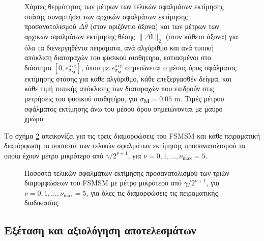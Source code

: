 \begin{figure}[!h]\vspace{2cm}\hspace{0.5cm}
  
  \vspace{1cm}
  \caption{\small Χάρτες θερμότητας των μέτρων των τελικών σφαλμάτων εκτίμησης
           στάσης συναρτήσει των αρχικών σφαλμάτων εκτίμησης προσανατολισμού
           $\Delta\hat{\theta}$ (στον οριζόντιο άξονα) και των μέτρων των
           αρχικων σφαλμάτων εκτίμησης θέσης $\|\Delta \hat{\bm{l}}\|_2$ (στον
           κάθετο άξονα) για όλα τα διενεργηθέντα πειράματα, ανά αλγόριθμο και
           ανά τυπική απόκλιση διαταραχών του φυσικού αισθητηρα, εστιασμένοι
           στο διάστημα $[0, e_{\sigma_{\bm{M}}}^{\text{avg}}]$, όπου με
           $e_{\sigma_{\bm{M}}}^{\text{avg}}$ σημειώνεται ο μέσος όρος
           σφάλματος εκτίμησης στάσης για κάθε αλγόριθμο, κάθε επεξεργασθέν
           δείγμα, και κάθε τιμή τυπικής απόκλισης των διαταραχών που επιδρούν
           στις μετρήσεις του φυσικού αισθητήρα, για $\sigma_{\bm{M}} = 0.05$
           m.  Τιμές μέτρου σφάλματος εκτίμησης άνω του μέσου όρου σημειώνονται
           με μαύρο χρώμα}
  \label{fig:02_04_05:09}
\end{figure}




Το σχήμα \ref{fig:02_04_05:13} απεικονίζει για τις τρεις διαμορφώσεις του FSMSM
και κάθε πειραματική διαμόρφωση τα ποσοστά των τελικών σφαλμάτων εκτίμησης
προσανατολισμού τα οποία έχουν μέτρο μικρότερο από $\gamma / 2^{\nu+1}$, για
$\nu = 0,1,\dots,\nu_{\max} = 5$.

\begin{figure}[!h]\centering
  
  \vspace{-0.5cm}
  \caption{\small Ποσοστά τελικών σφαλμάτων εκτίμησης προσανατολισμού των
           τριών διαμορφώσεων του FSMSM με μέτρο μικρότερο από $\gamma /
           2^{\nu+1}$, για $\nu = 0,1,\dots,\nu_{\max} = 5$, για όλες τις
           διαμορφώσεις τις πειραματικής διαδικασίας}
  \label{fig:02_04_05:13}
\end{figure}




\subsection{Εξέταση και αξιολόγηση αποτελεσμάτων}
\label{subsection:02_04_05:03}

